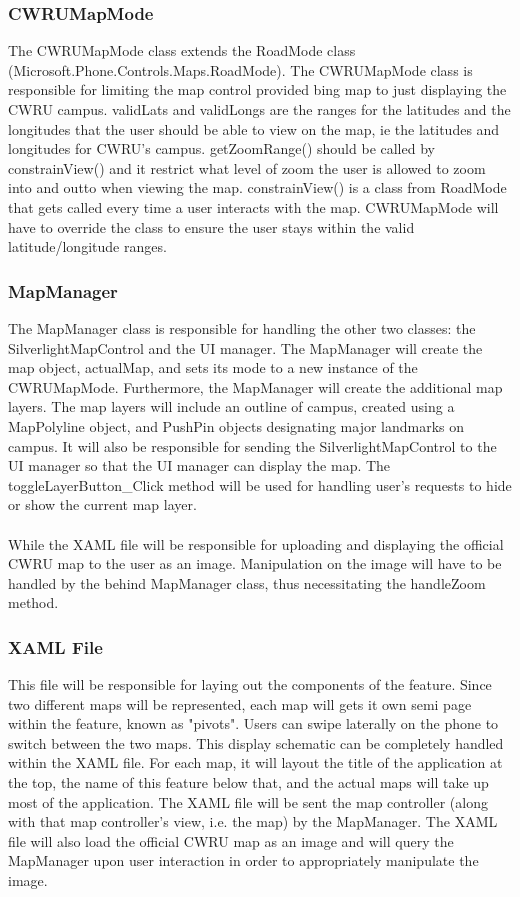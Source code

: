 \documentclass[pdftex,12pt,letter]{article}
\begin{document}
\subsubsection{CWRUMapMode}
The CWRUMapMode class extends the RoadMode class \\(Microsoft.Phone.Controls.Maps.RoadMode). The CWRUMapMode class is responsible for limiting the map control provided bing map to just displaying the CWRU campus. validLats and validLongs are the ranges for the latitudes and the longitudes that the user should be able to view on the map, ie the latitudes and longitudes for CWRU's campus. getZoomRange() should be called by constrainView() and it restrict what level of zoom the user is allowed to zoom into and outto when viewing the map. constrainView() is a class from RoadMode that gets called every time a user interacts with the map. CWRUMapMode will have to override the class to ensure the user stays within the valid latitude/longitude ranges.
\subsubsection{MapManager}
The MapManager class is responsible for handling the other two classes: the SilverlightMapControl and the UI manager. The MapManager will create the map object, actualMap, and sets its mode to a new instance of the CWRUMapMode. Furthermore, the MapManager will create the additional map layers. The map layers will include an outline of campus, created using a MapPolyline object, and PushPin objects designating major landmarks on campus.  It will also be responsible for sending the SilverlightMapControl to the UI manager so that the UI manager can display the map. The toggleLayerButton\_Click method will be used for handling user's requests to hide or show the current map layer.\\\\While the XAML file will be responsible for uploading and displaying the official CWRU map to the user as an image. Manipulation on the image will have to be handled by the behind MapManager class, thus necessitating the handleZoom method.
\subsubsection{XAML File}
This file will be responsible for laying out the components of the feature. Since two different maps will be represented, each map will gets it own semi page within the feature, known as "pivots". Users can swipe laterally on the phone to switch between the two maps. This display schematic can be completely handled within the XAML file. For each map, it will layout the title of the application at the top, the name of this feature below that, and the actual maps will take up most of the application. The XAML file will be sent the map controller (along with that map controller's view, i.e. the map) by the MapManager. The XAML file will also load the official CWRU map as an image and will query the MapManager upon user interaction in order to appropriately manipulate the image.
\end{document}
